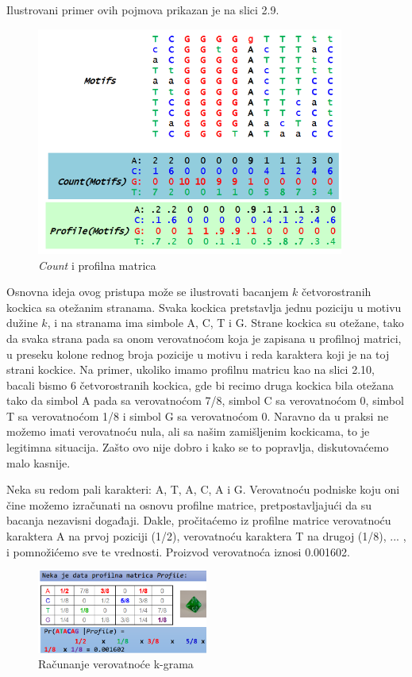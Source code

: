 Ilustrovani primer ovih pojmova prikazan je na slici 2.9.

\begin{figure}[h]
\caption{\textit{Count} i profilna matrica}
\centering
\includegraphics[width=0.9\textwidth]{poglavlja/2/slike/56.PNG}
\end{figure}

Osnovna ideja ovog pristupa može se ilustrovati bacanjem $k$ četvorostranih kockica sa otežanim stranama. Svaka kockica pretstavlja jednu poziciju u motivu dužine $k$, i na stranama ima simbole A, C, T i G. Strane kockica su otežane, tako da svaka strana pada sa onom verovatnoćom koja je zapisana u profilnoj matrici, u preseku kolone rednog broja pozicije u motivu i reda karaktera koji je na toj strani kockice. Na primer, ukoliko imamo profilnu matricu kao na slici 2.10, bacali bismo 6 četvorostranih kockica, gde bi recimo druga kockica bila otežana tako da simbol A pada sa verovatnoćom 7/8, simbol C sa verovatnoćom 0, simbol T sa verovatnoćom 1/8 i simbol G sa verovatnoćom 0. Naravno da u praksi ne možemo imati verovatnoću nula, ali sa našim zamišljenim kockicama, to je legitimna situacija. Zašto ovo nije dobro i kako se to popravlja, diskutovaćemo malo kasnije. 

Neka su redom pali karakteri: A, T, A, C, A i G. Verovatnoću podniske koju oni čine možemo izračunati na osnovu profilne matrice, pretpostavljajući da su bacanja nezavisni događaji. Dakle, pročitaćemo iz profilne matrice verovatnoću karaktera A na prvoj poziciji (1/2), verovatnoću karaktera T na drugoj (1/8), ... , i pomnožićemo sve te vrednosti. Proizvod verovatnoća iznosi 0.001602.

\begin{figure}[h]
\caption{Računanje verovatnoće k-grama}
\centering
\includegraphics[width=0.5\textwidth]{poglavlja/2/slike/61.PNG}
\end{figure}

